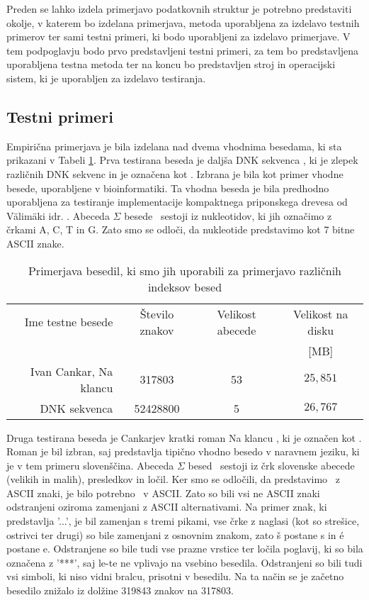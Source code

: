 Preden se lahko izdela primerjavo podatkovnih struktur je potrebno predstaviti okolje, v katerem bo izdelana primerjava, metoda uporabljena za izdelavo testnih primerov ter sami testni primeri, ki bodo uporabljeni za izdelavo primerjave. V tem podpoglavju bodo prvo predstavljeni testni primeri, za tem bo predstavljena uporabljena testna metoda ter na koncu bo predstavljen stroj in operacijski sistem, ki je uporabljen za izdelavo testiranja. 

\subsection{Testni primeri}

Empirična primerjava je bila izdelana nad dvema vhodnima besedama, ki sta prikazani v Tabeli \ref{tab:besedila}. Prva testirana beseda je daljša DNK sekvenca \cite{podatki}, ki je zlepek različnih DNK sekvenc in je označena kot \DNK. Izbrana je bila kot primer vhodne besede, uporabljene v bioinformatiki. Ta vhodna beseda je bila predhodno uporabljena za testiranje implementacije kompaktnega priponskega drevesa od Välimäki idr. \cite{Valimaki2007}. Abeceda $\Sigma$ besede \DNK\ sestoji iz nukleotidov, ki jih označimo z črkami A, C, T in G. Zato smo se odloči, da nukleotide predstavimo kot 7 bitne ASCII znake.

\begin{table}[htb]
    \caption{Primerjava besedil, ki smo jih uporabili za primerjavo različnih indeksov besed}
    \label{tab:besedila}
    \centering
    \begin{tabular}{rccc}
        Ime testne besede& Število znakov & Velikost abecede & Velikost na disku \\
        &  &   & [MB]\\
         \hline
        Ivan Cankar, Na klancu \cite{podatkiNaKlancu}& 317803 & 53 & $25,851$ \\
        DNK sekvenca \cite{podatki}&  52428800& 5 & $26,767$ \\
    \end{tabular}    
\end{table}

Druga testirana beseda je Cankarjev kratki roman Na klancu \cite{podatkiNaKlancu}, ki je označen kot \NK. Roman je bil izbran, saj predstavlja tipično vhodno besedo v naravnem jeziku, ki je v tem primeru slovenščina. Abeceda $\Sigma$ besed \NK\ sestoji iz črk slovenske abecede (velikih in malih), presledkov in ločil. Ker smo se odločili, da predstavimo \DNK\ z ASCII znaki, je bilo potrebno \NK\ v ASCII. Zato so bili vsi ne ASCII znaki odstranjeni oziroma zamenjani z ASCII alternativami. Na primer znak, ki predstavlja '...', je bil zamenjan s tremi pikami, vse črke z naglasi (kot so strešice, ostrivci ter drugi) so bile zamenjani z osnovnim znakom, zato š postane s in é postane e. Odstranjene so bile tudi vse prazne vrstice ter ločila poglavij, ki so bila označena z '***', saj le-te ne vplivajo na vsebino besedila. Odstranjeni so bili tudi vsi simboli, ki niso vidni bralcu, prisotni v besedilu. Na ta način se je začetno besedilo znižalo iz dolžine 319843 znakov na 317803.

